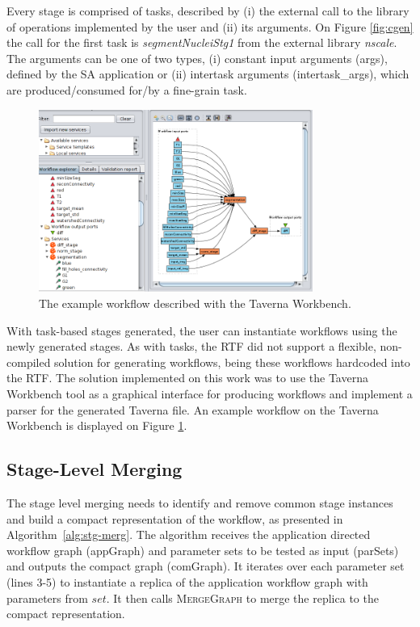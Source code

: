 Every stage is comprised of tasks, described by (i) the external call to the library of operations implemented by the user and (ii) its arguments. On Figure \ref{fig:cgen} the call for the first task is \textit{segmentNucleiStg1} from the external library \textit{nscale}. The arguments can be one of two types, (i) constant input arguments (args), defined by the SA application or (ii) intertask arguments (intertask\_args), which are produced/consumed for/by a fine-grain task.

\begin{figure}[h!]
\begin{center}
\includegraphics[width=0.8\textwidth]{img/taverna.png}
\caption{The example workflow described with the Taverna Workbench.}
\label{fig:tav1}
\end{center}
\vspace{-4mm}
\end{figure}

With task-based stages generated, the user can instantiate workflows using the newly generated stages. As with tasks, the RTF did not support a flexible, non-compiled solution for generating workflows, being these workflows hardcoded into the RTF. The solution implemented on this work was to use the Taverna Workbench tool \cite{taverna} as a graphical interface for producing workflows and implement a parser for the generated Taverna file. An example workflow on the Taverna Workbench is displayed on Figure \ref{fig:tav1}.

\subsection{Stage-Level Merging}
\label{sec:stage-merging}

The stage level merging needs to identify and remove common stage instances and build a compact representation of the workflow, as presented in Algorithm~\ref{alg:stg-merg}. The algorithm receives the application directed workflow graph (appGraph) and parameter sets to be tested as input (parSets) and outputs the compact graph (comGraph). It iterates over each parameter set (lines 3-5) to instantiate a replica of the application workflow graph with parameters from $set$. It then calls {\scshape MergeGraph} to merge the replica to the compact representation.  

